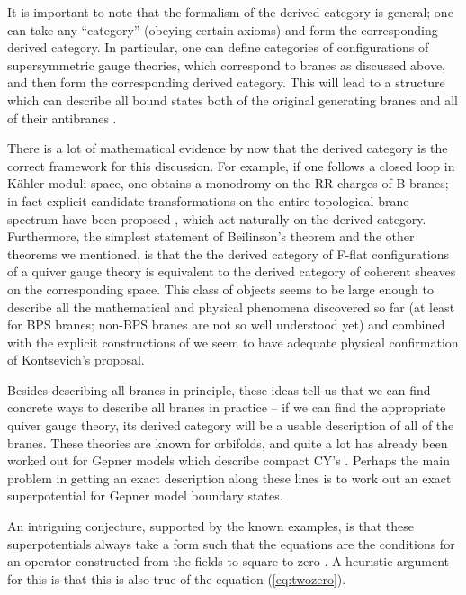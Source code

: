\documentclass[a4paper,12pt]{amsart}
\numberwithin{equation}{section}
\theoremstyle{plain}
\theoremstyle{definition}
\def\cal{\mathcal}
\def\p{\partial}
\def\CN{{\cal N}}
\begin{document}
It is important to note that the formalism of the derived category is
general; one can take any ``category'' (obeying certain axioms) and
form the corresponding derived category.  In particular, one can
define categories of configurations of \myHighlight{$\CN=1$}\coordHE{} supersymmetric gauge
theories, which correspond to branes as discussed above, and then form
the corresponding derived category.  This will lead to a structure
which can describe all bound states both of the original generating
branes \coordHE{} and all of their antibranes \coordHE{}.

There is a lot of mathematical evidence by now that the derived
category is the correct framework for this discussion.  For example,
if one follows a closed loop in K\"ahler moduli space, one obtains a
monodromy on the RR charges of B branes; in fact explicit candidate
transformations on the entire topological brane spectrum have been
proposed \cite{Horja,SeidelThomas}, which act naturally on the derived
category.  Furthermore, the simplest statement of Beilinson's theorem
and the other theorems we mentioned, is that the the derived category
of F-flat configurations of a quiver gauge theory is equivalent to the
derived category of coherent sheaves on the corresponding space.  This
class of objects seems to be large enough to describe all the
mathematical and physical phenomena discovered so far (at least for
BPS branes; non-BPS branes are not so well understood yet) and
combined with the explicit constructions of \cite{DCS,AspLaw,Diac}
we seem to have
adequate physical confirmation of Kontsevich's proposal.

Besides describing all branes in principle, these ideas tell us that
we can find concrete ways to describe all branes in practice -- if we
can find the appropriate quiver gauge theory, its derived category
will be a usable description of all of the branes.  These theories are
known for orbifolds, and quite a lot has already been worked out for
Gepner models which describe compact CY's \cite{DD,GJ,Mayr,Tomas}.
Perhaps the main problem in getting an exact description along these
lines is to work out an exact superpotential for Gepner model boundary
states.

An intriguing conjecture, supported by the known examples, is that
these superpotentials always take a form such that the equations \myHighlight{$\p
W/\p \phi_i=0$}\coordHE{} are the conditions for an operator \coordHE{} constructed from
the fields \myHighlight{$\phi$}\coordHE{} to square to zero \cite{toappear}.  A heuristic
argument for this is that this is also true of the equation
(\ref{eq:twozero}).
\end{document}
